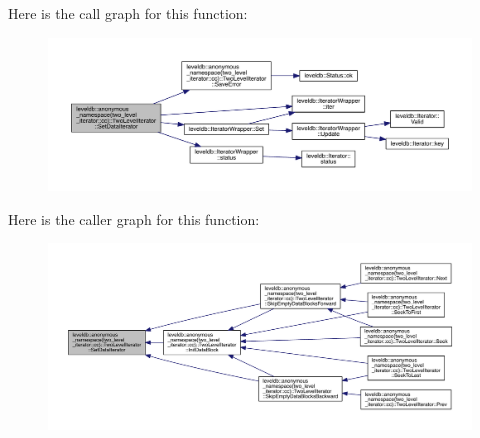 Here is the call graph for this function\+:
\nopagebreak
\begin{figure}[H]
\begin{center}
\leavevmode
\includegraphics[width=350pt]{classleveldb_1_1anonymous__namespace_02two__level__iterator_8cc_03_1_1_two_level_iterator_ada5ab8faac914e18e5c3980f53da4d66_cgraph}
\end{center}
\end{figure}




Here is the caller graph for this function\+:
\nopagebreak
\begin{figure}[H]
\begin{center}
\leavevmode
\includegraphics[width=350pt]{classleveldb_1_1anonymous__namespace_02two__level__iterator_8cc_03_1_1_two_level_iterator_ada5ab8faac914e18e5c3980f53da4d66_icgraph}
\end{center}
\end{figure}


\hypertarget{classleveldb_1_1anonymous__namespace_02two__level__iterator_8cc_03_1_1_two_level_iterator_a04e7e9fcbea9d4ac35c71d4d430b4ae1}{}

